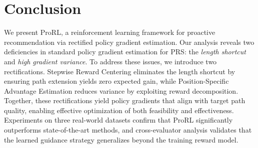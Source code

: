 \section{Conclusion}
We present ProRL, a reinforcement learning framework for proactive 
recommendation via rectified policy gradient estimation. Our analysis reveals two deficiencies in standard policy gradient estimation for PRS: the \emph{length shortcut} and \emph{high gradient variance}. To address these issues, we introduce two rectifications. Stepwise Reward Centering eliminates the length shortcut by ensuring path extension yields zero expected gain, while Position-Specific Advantage Estimation reduces variance by exploiting reward decomposition. Together, these rectifications yield policy gradients that align with target path quality, enabling effective optimization of both feasibility and effectiveness. Experiments on three real-world datasets confirm that ProRL significantly outperforms state-of-the-art methods, and cross-evaluator analysis validates that the learned guidance strategy generalizes beyond the training reward model.
